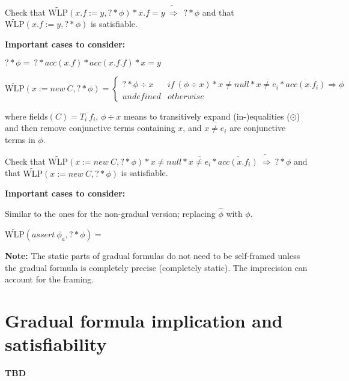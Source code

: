 \documentclass {article}
\newcommand{\fphi}{\widehat{\phi}}
\newcommand{\imp}{\Rightarrow}
\newcommand{\timp}{\ \widetilde{\Rightarrow}\ }
\newcommand{\twlp}[2]{\widetilde{\text{WLP}}(#1,#2)}
\begin{document}
Check that $\twlp{x.f := y}{? \ast \phi} \ast x.f = y \timp \ ? \ast \phi$ and that $\twlp{x.f := y}{? \ast \phi}$ is satisfiable.

\textbf{Important cases to consider:}

$? \ast \phi = \ ? \ast acc(x.f) \ast acc(x.f.f) \ast x = y $

\vspace{0.5cm}

$\twlp{x := new\ C}{? \ast \phi} = 
	\begin{cases}
	 ? \ast \phi \div x & if \ (\phi \div x) \ast x \neq null \ast \overline{x \neq e_i} \ast \overline{acc(x.f_i)} \imp \phi \\
	 undefined & otherwise
	\end{cases}$ 

where fields$(C) = \overline{T_i \ f_i}$, $\phi \div x$ means to transitively expand (in-)equalities ($\odot$) and then remove conjunctive terms containing $x$, and $\overline{x \neq e_i}$ are conjunctive terms in $\phi$. 

Check that $\twlp{x := new\ C}{? \ast \phi} \ast x \neq null \ast \overline{x \neq e_i} \ast \overline{acc(x.f_i)} \timp ? \ast \phi$ and that $\twlp{x := new\ C}{? \ast \phi}$ is satisfiable.

\textbf{Important cases to consider:}

Similar to the ones for the non-gradual version; replacing $\fphi$ with $\phi$.

%
%
%

\vspace{0.5cm}

$\twlp{assert\ \phi_a}{? \ast \phi} = $

%
%
%
%

\textbf{Note:} The static parts of gradual formulas do not need to be self-framed unless the gradual formula is completely precise (completely static). The imprecision can account for the framing.

\section{Gradual formula implication and satisfiability}

\textbf{TBD}
\end{document}
